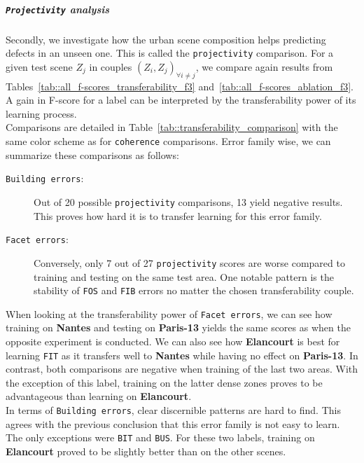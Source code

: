         \subparagraph{\texttt{Projectivity} analysis}
            Secondly, we investigate how the urban scene composition helps predicting defects in an unseen one.
            This is called the \texttt{projectivity} comparison.
            For a given test scene $Z_j$ in couples $(Z_i, Z_j)_{\forall i \neq j}$, we compare again results from Tables~\ref{tab::all_f-scores_transferability_f3} and~\ref{tab::all_f-scores_ablation_f3}.
            A gain in F-score for a label can be interpreted by the transferability power of its learning process.\\

            Comparisons are detailed in Table~\ref{tab::transferability_comparison} with the same color scheme as for \texttt{coherence} comparisons.
            Error family wise, we can summarize these comparisons as follows:
            \begin{description}
                \item[\texttt{Building errors}:] Out of 20 possible \texttt{projectivity} comparisons, 13 yield negative results.
                        This proves how hard it is to transfer learning for this error family.
                \item[\texttt{Facet errors}:] Conversely, only 7 out of 27 \texttt{projectivity} scores are worse compared to training and testing on the same test area.
                        One notable pattern is the stability of \texttt{FOS} and \texttt{FIB} errors no matter the chosen transferability couple.
            \end{description}

            When looking at the transferability power of \texttt{Facet errors}, we can see how training on \textbf{Nantes} and testing on \textbf{Paris-13} yields the same scores as when the opposite experiment is conducted.
            We can also see how \textbf{Elancourt} is best for learning \texttt{FIT} as it transfers well to \textbf{Nantes} while having no effect on \textbf{Paris-13}.
            In contrast, both comparisons are negative when training of the last two areas.
            With the exception of this label, training on the latter dense zones proves to be advantageous than learning on \textbf{Elancourt}.\\
            In terms of \texttt{Building errors}, clear discernible patterns are hard to find.
            This agrees with the previous conclusion that this error family is not easy to learn.
            The only exceptions were \texttt{BIT} and \texttt{BUS}.
            For these two labels, training on \textbf{Elancourt} proved to be slightly better than on the other scenes.

